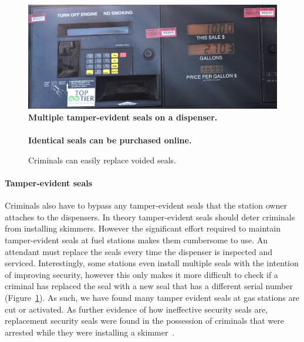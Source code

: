 \begin{figure}
\centering
\includegraphics[width=\linewidth]{fig/tamperseal-pump.jpg}
\textbf{Multiple tamper-evident seals on a dispenser.}\\
\vspace{0.2in}
\\
\textbf{Identical seals can be purchased online.}
\caption{
\label{fig:tamperseal}
Criminals can easily replace voided seals.
}
\end{figure}

\paragraph{Tamper-evident seals}
%
Criminals also have to bypass any tamper-evident seals that the station owner
attaches to the dispensers.
%
In theory tamper-evident seals should deter criminals from installing skimmers.
%
However the significant effort required to maintain tamper-evident seals at
fuel stations makes them cumbersome to use.
%
An attendant must replace the seals every time the dispenser is inspected and
serviced.
%
Interestingly, some stations even install multiple seals with the intention of 
improving security, however this only makes it more difficult to check
if a criminal has replaced the seal with a new seal that has a different serial
number (Figure~\ref{fig:tamperseal}).
%
As such, we have found many tamper evident seals at gas stations are cut or
activated.
%
As further evidence of how ineffective security seals are, replacement security
seals were found in the possession of criminals that were arrested while they
were installing a skimmer~\cite{texas_criminal_security_seal}.





